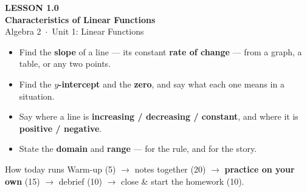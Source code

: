\documentclass[aspectratio=169, 11pt]{beamer}
\begin{document}
{
\begin{frame}[plain]
  \vspace{2.8cm}\hspace{0.55cm}%
  \begin{minipage}{0.9\textwidth}
    {\color{goldacc}\bfseries\small LESSON 1.0}\\[0.5cm]
    {\color{white}\bfseries\LARGE Characteristics of Linear Functions}\\[1.2cm]
    {\color{forestmid}\small Algebra 2~$\cdot$~Unit 1: Linear Functions}
  \end{minipage}
\end{frame}
}

\begin{frame}[t, plain]
  \begin{itemize}\setlength{\itemsep}{6pt}
    \item Find the \textbf{slope} of a line --- its constant \textbf{rate of change} --- from a
          graph, a table, or any two points.
    \item Find the \textbf{$y$-intercept} and the \textbf{zero}, and say what each one means in a
          situation.
    \item Say where a line is \textbf{increasing / decreasing / constant}, and where it is
          \textbf{positive / negative}.
    \item State the \textbf{domain} and \textbf{range} --- for the rule, and for the story.
  \end{itemize}
  \vspace{4pt}
  \begin{block}{How today runs}
    Warm-up (5) $\to$ notes together (20) $\to$ \textbf{practice on your own} (15) $\to$ debrief
    (10) $\to$ close \& start the homework (10).
  \end{block}
\end{frame}
\end{document}
